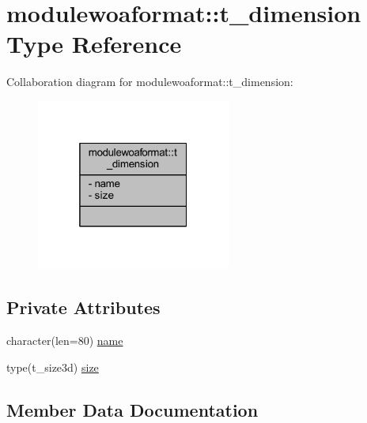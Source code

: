 \hypertarget{structmodulewoaformat_1_1t__dimension}{}\section{modulewoaformat\+:\+:t\+\_\+dimension Type Reference}
\label{structmodulewoaformat_1_1t__dimension}


Collaboration diagram for modulewoaformat\+:\+:t\+\_\+dimension\+:\nopagebreak
\begin{figure}[H]
\begin{center}
\leavevmode
\includegraphics[width=181pt]{structmodulewoaformat_1_1t__dimension__coll__graph}
\end{center}
\end{figure}
\subsection*{Private Attributes}
\begin{DoxyCompactItemize}
\item 
character(len=80) \mbox{\hyperlink{structmodulewoaformat_1_1t__dimension_af8a3dccaef8a90f9163e42de1acbe729}{name}}
\item 
type(t\+\_\+size3d) \mbox{\hyperlink{structmodulewoaformat_1_1t__dimension_ac851e48eeddc8280dab7d6fdce09134f}{size}}
\end{DoxyCompactItemize}


\subsection{Member Data Documentation}
\mbox{\label{structmodulewoaformat_1_1t__dimension_af8a3dccaef8a90f9163e42de1acbe729}} 

